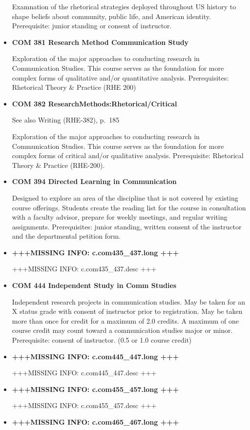 \documentclass[
  letterpaper,
]{scrbook}
\begin{document}
\begin{itemize}
  Examnation of the rhetorical strategies deployed throughout US history
  to shape beliefs about community, public life, and American identity.
  Prerequisite: junior standing or consent of instructor.
\item
  \textbf{COM 381 Research Method Communication Study}

  Exploration of the major approaches to conducting research in
  Communication Studies. This course serves as the foundation for more
  complex forms of qualitative and/or quantitative analysis.
  Prerequisites: Rhetorical Theory \& Practice (RHE 200)
\item
  \textbf{COM 382 ResearchMethods:Rhetorical/Critical}

  See also Writing (RHE-382), p.~185

  Exploration of the major approaches to conducting research in
  Communication Studies. This course serves as the foundation for more
  complex forms of critical and/or qualitative analysis. Prerequisite:
  Rhetorical Theory \& Practice (RHE-200).
\item
  \textbf{COM 394 Directed Learning in Communication}

  Designed to explore an area of the discipline that is not covered by
  existing course offerings. Students create the reading list for the
  course in consultation with a faculty advisor, prepare for weekly
  meetings, and regular writing assignments. Prerequisites: junior
  standing, written consent of the instructor and the departmental
  petition form.
\item
  \textbf{+++MISSING INFO: c.com435\_437.long +++}

  +++MISSING INFO: c.com435\_437.desc +++
\item
  \textbf{COM 444 Independent Study in Comm Studies}

  Independent research projects in communication studies. May be taken
  for an X status grade with consent of instructor prior to
  registration. May be taken more than once for credit for a maximum of
  2.0 credits. A maximum of one course credit may count toward a
  communication studies major or minor. Prerequisite: consent of
  instructor. (0.5 or 1.0 course credit)
\item
  \textbf{+++MISSING INFO: c.com445\_447.long +++}

  +++MISSING INFO: c.com445\_447.desc +++
\item
  \textbf{+++MISSING INFO: c.com455\_457.long +++}

  +++MISSING INFO: c.com455\_457.desc +++
\item
  \textbf{+++MISSING INFO: c.com465\_467.long +++}


\end{itemize}
\end{document}
